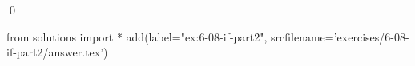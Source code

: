 
\begin{ex}
  \label{ex:6-08-if-part2}
  
  \qed
\end{ex}
\begin{python0}
from solutions import *
add(label="ex:6-08-if-part2",
    srcfilename='exercises/6-08-if-part2/answer.tex')
\end{python0}
